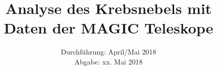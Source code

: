 

\subject{Lehrstuhlversuch E5b}
\title{Analyse des Krebsnebels mit Daten der MAGIC Teleskope}
\date{Durchführung: April/Mai 2018 \\
      Abgabe: xx. Mai 2018}



\maketitle
\newpage






\printbibliography


